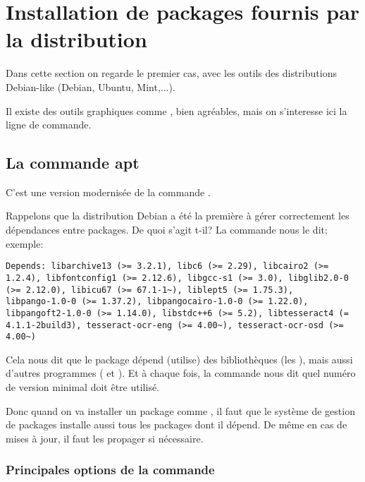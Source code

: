 
\section{Installation de packages fournis par la distribution}
Dans cette section on regarde le premier cas, avec les outils des
distributions \og Debian-like\fg{} (Debian, Ubuntu, Mint,...).

Il existe des outils graphiques comme , bien agréables,
mais on s'interesse ici la ligne de commande.

\subsection{La commande apt}
C'est une version modernisée de la commande .

Rappelons que la distribution Debian a été la première à gérer
correctement les dépendances entre packages. De quoi s'agit t-il?
La commande  nous le dit; exemple:
\begin{center}
\end{center}

\begin{verbatim}
Depends: libarchive13 (>= 3.2.1), libc6 (>= 2.29), libcairo2 (>=
1.2.4), libfontconfig1 (>= 2.12.6), libgcc-s1 (>= 3.0), libglib2.0-0
(>= 2.12.0), libicu67 (>= 67.1-1~), liblept5 (>= 1.75.3),
libpango-1.0-0 (>= 1.37.2), libpangocairo-1.0-0 (>= 1.22.0),
libpangoft2-1.0-0 (>= 1.14.0), libstdc++6 (>= 5.2), libtesseract4 (=
4.1.1-2build3), tesseract-ocr-eng (>= 4.00~), tesseract-ocr-osd (>=
4.00~) 
\end{verbatim}

Cela nous dit que le package  dépend (utilise) des
bibliothèques (les ), mais aussi d'autres programmes ( et ). Et à
chaque fois, la commande nous dit quel numéro de version minimal doit
être utilisé.

Donc quand on va installer un package comme 
, il faut que le système de gestion de packages
installe aussi tous les packages dont il dépend. De même en cas de mises à
jour, il faut les propager si nécessaire.

\subsubsection{Principales options de la commande }

